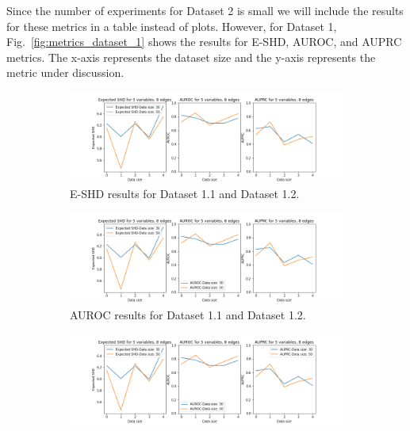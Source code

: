 \documentclass{lxaiproposal}
\begin{document}
    Since the number of experiments for Dataset 2 is small we will include the results for these metrics in a
    table instead of plots. However, for Dataset 1, Fig.~\ref{fig:metrics_dataset_1} shows the results for E-SHD, AUROC,
    and AUPRC metrics. The x-axis represents the dataset size and the y-axis represents the metric under discussion.

    \begin{figure}[h]
        \centering
        \begin{subfigure}{0.98\textwidth}
            \centering
            \includegraphics[width=\textwidth]{figures/expected_0_5_8}
            \caption{E-SHD results for Dataset 1.1 and Dataset 1.2.}
            \label{fig:eshd_5_8}
        \end{subfigure}
        \begin{subfigure}{0.98\textwidth}
            \centering
            \includegraphics[width=\textwidth]{figures/expected_1_5_8}
            \caption{AUROC results for Dataset 1.1 and Dataset 1.2.}
            \label{fig:auroc_5_8}
        \end{subfigure}
        \begin{subfigure}{0.98\textwidth}
            \centering
            \includegraphics[width=\textwidth]{figures/expected_2_5_8}

\end{subfigure}
\end{figure}
\end{document}
